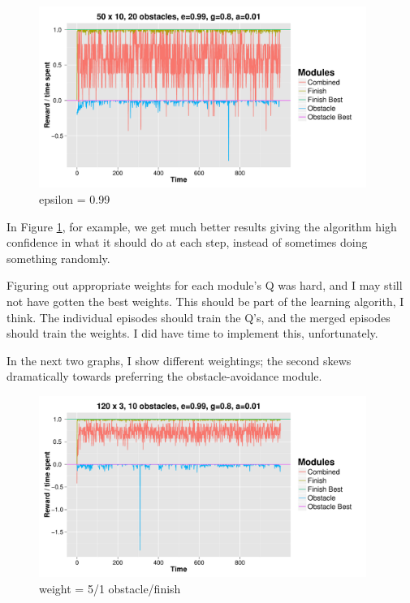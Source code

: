 \documentclass[11pt]{report}
\begin{document}
\begin{figure}[H]
  \centering
  \includegraphics[width=0.95\textwidth]{results/qlearn-s50x10-o20-e99.pdf}
  \caption{epsilon = 0.99}
  \label{fig:ep099}
\end{figure}

\noindent In Figure \ref{fig:ep099}, for example, we get much better results giving the algorithm high confidence in what it should do at each step, instead of sometimes doing something randomly.

Figuring out appropriate weights for each module's Q was hard, and I may still not have gotten the best weights. This should be part of the learning algorith, I think. The individual episodes should train the Q's, and the merged episodes should train the weights. I did have time to implement this, unfortunately.

In the next two graphs, I show different weightings; the second skews dramatically towards preferring the obstacle-avoidance module.

\begin{figure}[H]
  \centering
  \includegraphics[width=0.95\textwidth]{results/qlearn-s120x3-o10.pdf}
  \caption{weight = 5/1 obstacle/finish}
\end{figure}
\end{document}

